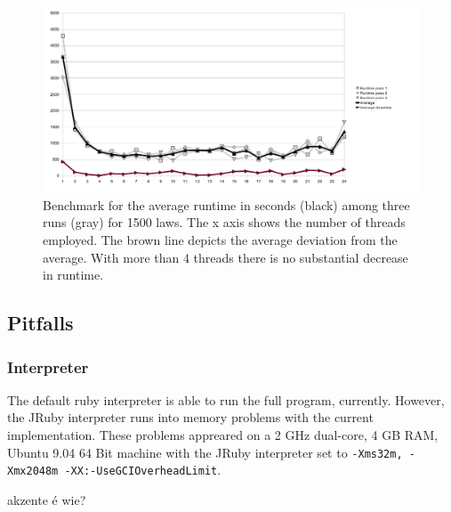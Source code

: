 \documentclass{scrartcl}
\begin{document}
\begin{figure}[ht]
\begin{center}
\includegraphics[width = \textwidth]{benchmark}
\caption{Benchmark for the average runtime in seconds (black) among three runs (gray) for 1500 laws. The x axis shows the number of threads employed. The brown line depicts the average deviation from the average. With more than 4 threads there is no substantial decrease in runtime.}
\label{fig:benchmark}
\end{center}
\end{figure}

\subsection{Pitfalls}
\subsubsection{Interpreter}
The default ruby interpreter is able to run the full program, currently. However, the JRuby interpreter runs into memory problems with the current implementation. These problems appreared on a 2 GHz dual-core, 4 GB RAM, Ubuntu 9.04 64 Bit machine with the JRuby interpreter set to \texttt{-Xms32m, -Xmx2048m -XX:-UseGCIOverheadLimit}.

akzente é wie?
\end{document}
